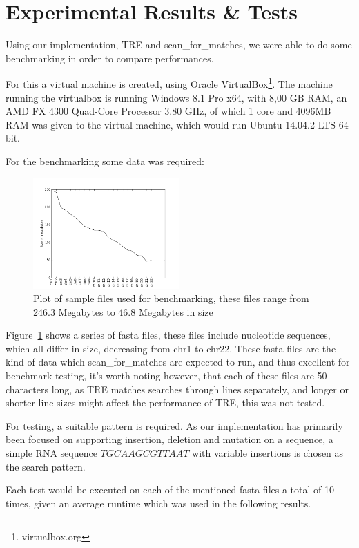 \section{Experimental Results \& Tests}
Using our implementation, TRE and scan\_for\_matches, we were able to do some benchmarking in order to compare performances.

For this a virtual machine is created, using Oracle VirtualBox\footnote{virtualbox.org}. The machine running the virtualbox is running Windows 8.1 Pro x64, with 8,00 GB RAM, an AMD FX 4300 Quad-Core Processor 3.80 GHz, of which 1 core and 4096MB RAM was given to the virtual machine, which would run Ubuntu 14.04.2 LTS 64 bit.

For the benchmarking some data was required:
\begin{figure}[h!]
\centering
\includegraphics[width=0.5\textwidth]{Benchmarking/size.png}
\caption{Plot of sample files used for benchmarking, these files range from 246.3 Megabytes to 46.8 Megabytes in size}
\label{fig:size}
\end{figure}


Figure~\ref{fig:size} shows a series of fasta files, these files include nucleotide sequences, which all differ in size, decreasing from chr1 to chr22. These fasta files are the  kind of data which scan\_for\_matches are expected to run, and thus excellent for benchmark testing, it's worth noting however, that each of these files are 50 characters long, as TRE matches searches through lines separately, and longer or shorter line sizes might affect the performance of TRE, this was not tested.

For testing, a suitable pattern is required. As our implementation has primarily been focused on supporting insertion, deletion and mutation on a sequence, a simple RNA sequence $TGCAAGCGTTAAT$ with variable insertions is chosen as the search pattern.

Each test would be executed on each of the mentioned fasta files a total of 10 times, given an average runtime which was used in the following results.

